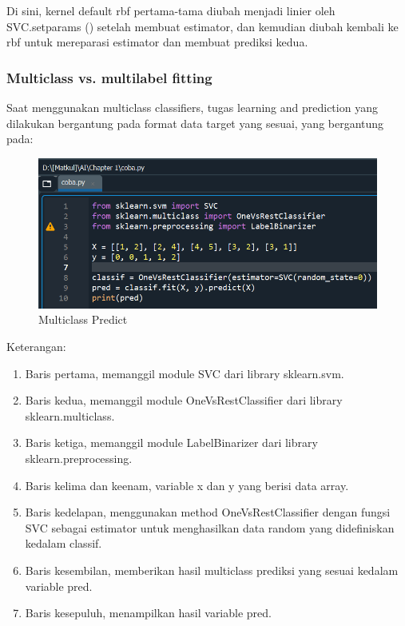 \par Di sini, kernel default rbf pertama-tama diubah menjadi linier oleh SVC.setparams () setelah membuat estimator, dan kemudian diubah kembali ke rbf untuk mereparasi estimator dan membuat prediksi kedua.

\subsubsection{Multiclass vs. multilabel fitting}

\par Saat menggunakan multiclass classifiers, tugas learning and prediction yang dilakukan bergantung pada format data target yang sesuai, yang bergantung pada:

    \begin{figure}[H]
    \centering
    \includegraphics[width=13cm]{figures/1184023/26.PNG}
    \caption{Multiclass Predict}
    \end{figure}

\par Keterangan:
    \begin{enumerate}
        \item Baris pertama, memanggil module SVC dari library sklearn.svm.
        \item Baris kedua, memanggil module OneVsRestClassifier dari library sklearn.multiclass.
        \item Baris ketiga, memanggil module LabelBinarizer dari library sklearn.preprocessing.
        \item Baris kelima dan keenam, variable x dan y yang berisi data array.
        \item Baris kedelapan, menggunakan method OneVsRestClassifier dengan fungsi SVC sebagai estimator untuk menghasilkan data random yang didefiniskan kedalam classif.
        \item Baris kesembilan, memberikan hasil multiclass prediksi yang sesuai kedalam variable pred.
        \item Baris kesepuluh, menampilkan hasil variable pred.
    \end{enumerate}

